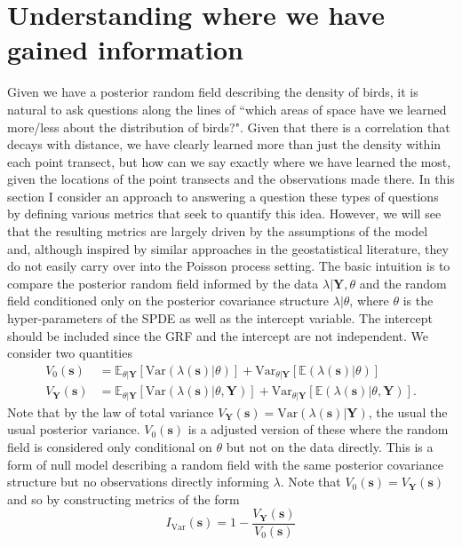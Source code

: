 \documentclass[12pt]{article}
\newcommand{\bm}{\boldsymbol}  %
\newcommand{\bs}{\boldsymbol{s}}
\begin{document}
\section*{Understanding where we have gained information}

Given we have a posterior random field describing the density of birds, it is natural to ask questions along the lines of ``which areas of space have we learned more/less about the distribution of birds?".  Given that there is a correlation that decays with distance, we have clearly learned more than just the density within each point transect, but how can we say exactly where we have learned the most, given the locations of the point transects and the observations made there.  In this section I consider an approach to answering a question these types of questions by defining various metrics that seek to quantify this idea.  However, we will see that the resulting metrics are largely driven by the assumptions of the model and, although inspired by similar approaches in the geostatistical literature, they do not easily carry over into the Poisson process setting.  The basic intuition is to compare the posterior random field informed by the data $\lambda | \bm{Y}, \theta$ and the random field conditioned only on the posterior covariance structure $\lambda | \theta$, where $\theta$ is the hyper-parameters of the SPDE as well as the intercept variable.  The intercept should be included since the GRF and the intercept are not independent.  We consider two quantities
\begin{align}
   V_0(\bs) &= \mathbb{E}_{\theta | \bm{Y}} \left[ \text{Var}(\lambda(\bs) | \theta) \right] + \text{Var}_{\theta | \bm{Y}}\left[\mathbb{E}(\lambda(\bs) | \theta)\right] \\  
   V_{\bm{Y}}(\bs) &= \mathbb{E}_{\theta | \bm{Y}} \left[ \text{Var}(\lambda(\bs) | \theta, \bm{Y}) \right] + \text{Var}_{\theta | \bm{Y}}\left[\mathbb{E}(\lambda(\bs) | \theta, \bm{Y})\right].
\end{align}
Note that by the law of total variance $V_{\bm{Y}}(\bs) = \text{Var}(\lambda(\bs) | \bm{Y})$, the usual the usual posterior variance.  $V_0(\bs)$ is a adjusted version of these where the random field is considered only conditional on $\theta$ but not on the data directly.  This is a form of null model describing a random field with the same posterior covariance structure but no observations directly informing $\lambda$.  Note that $V_0(\bs) = V_{\bm{Y}}(\bs)$ and so by constructing metrics of the form
\begin{equation*}
		I_{\text{Var}}(\bs) = 1 - \frac{V_{\bm{Y}}(\bs)}{V_0(\bs)}
\end{equation*}  
\end{document}
